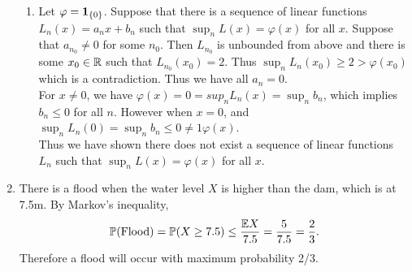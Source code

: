 \documentclass{article}
\begin{document}
\begin{enumerate}
\begin{enumerate}
		\item Let $\varphi={\mathbf 1}_{\{0\}}$. Suppose that there is a sequence of linear functions $L_n(x)=a_nx+b_n$ such that $\sup_n L(x)=\varphi(x)$ for all $x$. Suppose that $a_{n_0}\neq 0$ for some $n_0$. Then $L_{n_0}$ is unbounded from above and there is some $x_0\in {\mathbb R}$ such that $L_{n_0}(x_0)=2$. Thus $\sup_n L_n(x_0)\geq 2>\varphi(x_0)$ which is a contradiction. Thus we have all $a_n=0$.\\
		\newline
		For $x\neq 0$, we have $\varphi(x)=0=sup_n L_n(x)=\sup_n b_n$, which implies $b_n\leq 0$ for all $n$. However when $x=0$, and $\sup_n L_n(0)=\sup_n b_n\leq 0\neq 1 \varphi(x)$. \\
		\newline
		Thus we have shown there does not exist a sequence of linear  functions $L_n$ such that $\sup_n L(x)=\varphi(x)$ for all $x$.
		\end{enumerate}
	\item There is a flood when the water level $X$ is higher than the dam, which is at 7.5m. By Markov's inequality,
	\begin{align*}
	{\mathbb P}(\text{Flood})={\mathbb P}(X\geq 7.5)\leq \frac{{\mathbb E} X}{7.5}=\frac{5}{7.5}=\frac{2}{3}.
	\end{align*}
	Therefore a flood will occur with maximum probability 2/3.
	

\end{enumerate}
\end{document}
